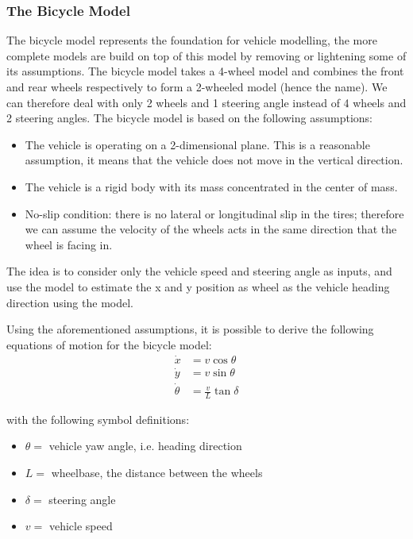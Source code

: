 \documentclass[a4paper,12pt,sort&compress]{article}
\begin{document}
    \subsubsection*{The Bicycle Model}
    The bicycle model represents the foundation for vehicle modelling,
    the more complete models are build on top of this model by removing or
    lightening some of its assumptions. 
    The bicycle model takes a 4-wheel model and combines the front and rear
    wheels respectively to form a 2-wheeled model (hence the name). We can
    therefore deal with only 2 wheels and 1 steering angle instead of 4 wheels
    and 2 steering angles. 
    The bicycle model is based on the following assumptions:
    \begin{itemize}
        \item The vehicle is operating on a 2-dimensional plane. This is a reasonable assumption, it means that the vehicle
        does not move in the vertical direction.
        \item The vehicle is a rigid body with its mass concentrated in the center of mass.
        \item No-slip condition: there is no lateral or longitudinal slip in the
        tires; therefore we can assume the velocity of the wheels acts in the same
        direction that the wheel is facing in. 
    \end{itemize}

    The idea is to consider only the vehicle speed and steering angle as inputs,
    and use the model to estimate the x and y position as wheel as the vehicle
    heading direction using the model.

    Using the aforementioned assumptions, it is possible to derive the following
    equations of motion for the bicycle model:
    \begin{align} 
        \dot{x} &= v \cos \theta \\
        \dot{y} &= v \sin \theta \\
        \dot{\theta} &= \frac{v}{L} \tan \delta
    \end{align}

    with the following symbol definitions:
    \begin{itemize} 
        \item $\theta =$ vehicle yaw angle, i.e. heading direction
        \item $L =$ wheelbase, the distance between the wheels
        \item $\delta =$ steering angle
        \item $v =$ vehicle speed
    \end{itemize}
\end{document}
